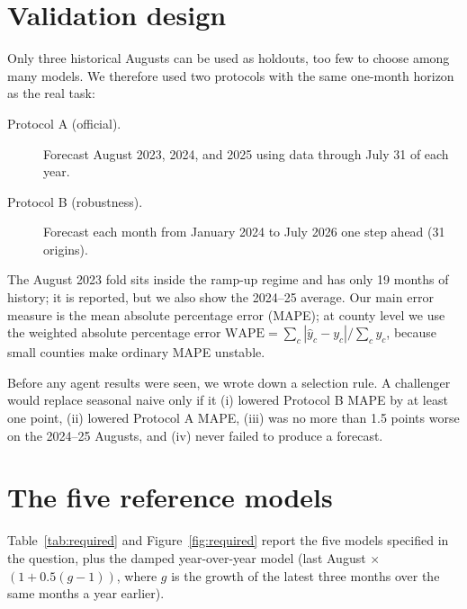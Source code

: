 \documentclass[11pt,letterpaper]{article}
\begin{document}
\section{Validation design}
Only three historical Augusts can be used as holdouts, too few to choose among many models. We
therefore used two protocols with the same one-month horizon as the real task:
\begin{description}
  \item[Protocol A (official).] Forecast August 2023, 2024, and 2025 using data through July 31 of
        each year.
  \item[Protocol B (robustness).] Forecast each month from January 2024 to July 2026 one step ahead
        (31 origins).
\end{description}
The August 2023 fold sits inside the ramp-up regime and has only 19 months of history; it is
reported, but we also show the 2024--25 average. Our main error measure is the mean absolute
percentage error (MAPE); at county level we use the weighted absolute percentage error
$\text{WAPE}=\sum_c|\hat y_c-y_c|/\sum_c y_c$, because small counties make ordinary MAPE unstable.

Before any agent results were seen, we wrote down a selection rule. A challenger would replace
seasonal naive only if it (i) lowered Protocol B MAPE by at least one point, (ii) lowered Protocol A
MAPE, (iii) was no more than 1.5 points worse on the 2024--25 Augusts, and (iv) never failed to
produce a forecast.

\section{The five reference models}
Table~\ref{tab:required} and Figure~\ref{fig:required} report the five models specified in the
question, plus the damped year-over-year model (last August $\times$ $(1+0.5(g-1))$, where $g$ is
the growth of the latest three months over the same months a year earlier).
\end{document}
